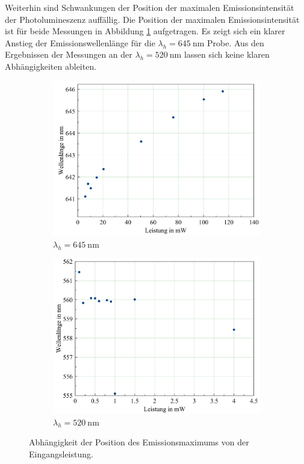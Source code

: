 Weiterhin sind Schwankungen der Position der maximalen Emissionsintensität der
Photolumineszenz auffällig. Die Position der maximalen Emissionsintensität ist für
beide Messungen in Abbildung \ref{fig:posem} aufgetragen. Es zeigt sich ein
klarer Anstieg der Emissionswellenlänge für die $\lambda_h=\SI{645}{\nano\meter}$
Probe. Aus den Ergebnissen der Messungen an der $\lambda_h=\SI{520}{\nano\meter}$
lassen sich keine klaren Abhängigkeiten ableiten.
\begin{figure}[H]
  \centering
  \begin{subfigure}{0.49\textwidth}
    \includegraphics[width=\textwidth]{plots/posemplot_645nm.png}
    \caption{$\lambda_h = \SI{645}{\nano\meter}$}
  \end{subfigure}
  \begin{subfigure}{0.49\textwidth}
    \includegraphics[width=\textwidth]{plots/posemplot_520.png}
    \caption{$\lambda_h = \SI{520}{\nano\meter}$}
  \end{subfigure}
  \caption{Abhängigkeit der Position des Emissionsmaximums von der Eingangsleistung.}
  \label{fig:posem}
\end{figure}

